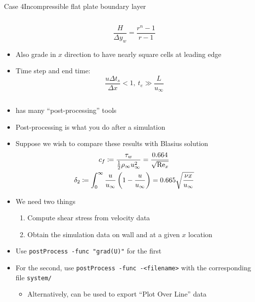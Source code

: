 \begin{frame}{Case 4}{Incompressible flat plate boundary layer}
\begin{columns}
\begin{column}{0.5\linewidth}
\begin{itemize}
                \begin{equation*}
                    \frac{H}{\Delta y_w} = \frac{r^n-1}{r-1}
                \end{equation*}
                \item Also grade in $x$ direction to have nearly square cells at leading edge
                \item Time step and end time:
                \begin{equation*}
                    \frac{u \Delta t_s}{\Delta x} < 1,~
                    t_e \gg \frac{L}{u_\infty}
                \end{equation*}
            \end{itemize}
        \end{column}
    \end{columns}
\end{frame}

\begin{frame}
    \begin{itemize}
        \setitemsep{0.5em}
        \item \openfoam{} has many ``post-processing'' tools
        \item Post-processing is what you do after a simulation
        \item Suppose we wish to compare these results with Blasius solution
        \begin{gather*}
            c_f \coloneqq \frac{\tau_w}{\frac{1}{2} \rho_\infty u_\infty^2} = \frac{0.664}{\sqrt{\text{Re}_x}}\\
            \delta_2 \coloneqq \int_{0}^{\infty} \frac{u}{u_\infty} \left( 1-\frac{u}{u_\infty} \right) = 0.665 \sqrt{\frac{\nu x}{u_\infty}}
        \end{gather*}
        \item We need two things
        \begin{enumerate}
            \item Compute shear stress from velocity data
            \item Obtain the simulation data on wall and at a given $x$ location
        \end{enumerate}
        \item Use \texttt{postProcess -func "grad(U)"} for the first
        \item For the second, use \texttt{postProcess -func -<filename>} with the corresponding file \texttt{system/}
        \begin{itemize}
            \item Alternatively, \paraview{} can be used to export ``Plot Over Line'' data
        \end{itemize}
    \end{itemize}
\end{frame}

